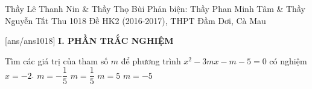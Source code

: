 	\begin{name}
{Thầy Lê Thanh Nin \& Thầy Thọ Bùi
	\newline Phản biện: Thầy Phan Minh Tâm \& Thầy Nguyễn Tất Thu}
{1018 Đề HK2 (2016-2017), THPT Đầm Dơi, Cà Mau}
	\end{name}
	\setcounter{ex}{0}\setcounter{bt}{0}
	[ans/ans1018]
\noindent\textbf{I. PHẦN TRẮC NGHIỆM}

\begin{ex}%
	Tìm các giá trị của tham số $ m $ để phương trình $ x^2-3mx-m-5=0 $ có nghiệm $ x=-2 $.
	\choice
	{$m=-\dfrac{1}{5}$}
	{\True $m=\dfrac{1}{5}$}
	{$m=5$}
	{$m=-5$}
\end{ex}

